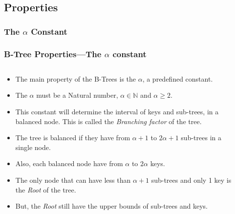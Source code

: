 \begin{frame}[allowframebreaks]
    \subsection{Properties}
    \subsubsection{The \(\alpha\) Constant}
    \frametitle{B-Tree Properties---The \(\alpha\) constant}
    \begin{columns}
        \begin{column}{\textlecolumn}
            \begin{block}{}
                \begin{itemize}
                    \item The main property of the B-Trees is the \(\alpha\), a predefined constant.
                    \item The \(\alpha\) must be a Natural number, \(\alpha \in \mathbb{N}\) and \(\alpha \geq 2\).
                    \item This constant will determine the interval of keys and sub-trees, in a balanced node. This is called the \emph{Branching factor} of the tree.
                    \item The tree is balanced if they have from \(\alpha + 1\) to \(2\alpha + 1\) sub-trees in a single node.
                    \item Also, each balanced node have from \(\alpha\) to \(2\alpha\) keys.
                    \item The only node that can have less than \(\alpha + 1\) sub-trees and only 1 key is the \emph{Root} of the tree. 
                    \item But, the \emph{Root} still have the upper bounds of sub-trees and keys.
                \end{itemize}
            \end{block}
        \end{column}
        \begin{column}{\textricolumn}
        \end{column}
    \end{columns}
    \begin{columns}
        \begin{column}{0.5\textwidth}
                \begin{figure}
                    \includegraphics[%

\end{figure}
\end{column}
\end{columns}
\end{frame}
